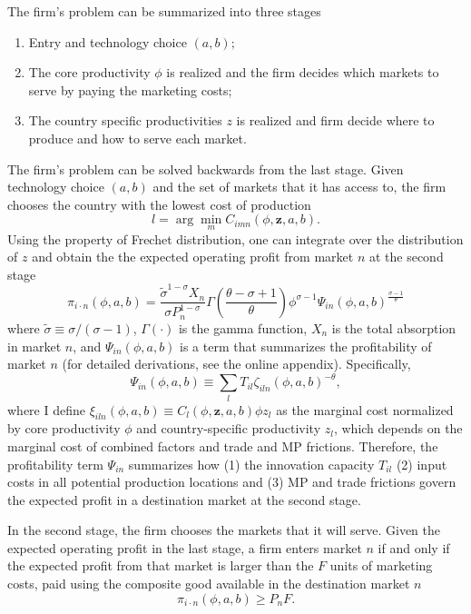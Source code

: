 \documentclass[notitlepage,11pt]{article}%
\begin{document}
The firm's problem can be summarized into three stages

\begin{enumerate}
\item Entry and technology choice $\left(  a,b\right)  ;$

\item The core productivity $\phi$ is realized and the firm decides which
markets to serve by paying the marketing costs;

\item The country specific productivities $z$ is realized and firm decide
where to produce and how to serve each market.
\end{enumerate}

The firm's problem can be solved backwards from the last stage. Given
technology choice $\left(  a,b\right)  $ and the set of markets that it has
access to, the firm chooses the country with the lowest cost of production%
\[
l=\arg\min_{m}C_{imn}\left(  \phi,\mathbf{z},a,b\right)  .
\]
Using the property of Frechet distribution, one can integrate over the
distribution of $z$ and obtain the the expected operating profit from market
$n$ at the second stage%
\[
\pi_{i\cdot n}\left(  \phi,a,b\right)  =\frac{\tilde{\sigma}^{1-\sigma}X_{n}%
}{\sigma P_{n}^{1-\sigma}}\Gamma\left(  \frac{\theta-\sigma+1}{\theta}\right)
\phi^{\sigma-1}\Psi_{in}\left(  \phi,a,b\right)  ^{\frac{\sigma-1}{\theta}}%
\]
where $\tilde{\sigma}\equiv\sigma/\left(  \sigma-1\right)  $, $\Gamma\left(
\cdot\right)  $ is the gamma function, $X_{n}$ is the total absorption in
market $n$, and $\Psi_{in}\left(  \phi,a,b\right)  $ is a term that summarizes
the profitability of market $n$ (for detailed derivations, see the online
appendix). Specifically,
\[
\Psi_{in}\left(  \phi,a,b\right)  \equiv\sum_{l}T_{il}\zeta_{iln}\left(
\phi,a,b\right)  ^{-\theta},
\]
where I define $\xi_{iln}\left(  \phi,a,b\right)  \equiv C_{l}\left(
\phi,\mathbf{z},a,b\right)  \phi z_{l}$ as the marginal cost normalized by
core productivity $\phi$ and country-specific productivity $z_{l}$, which
depends on the marginal cost of combined factors and trade and MP frictions.
Therefore, the profitability term $\Psi_{in}$ summarizes how (1) the
innovation capacity $T_{il}$ (2) input costs in all potential production
locations and (3) MP and trade frictions govern the expected profit in a
destination market at the second stage.

In the second stage, the firm chooses the markets that it will serve. Given
the expected operating profit in the last stage, a firm enters market $n$ if
and only if the expected profit from that market is larger than the $F$ units
of marketing costs, paid using the composite good available in the destination
market $n$%
\[
\pi_{i\cdot n}\left(  \phi,a,b\right)  \geq P_{n}F.
\]
\end{document}
